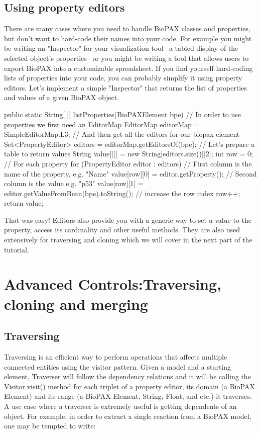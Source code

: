 \documentclass{tufte-book}
\begin{document}
\section{Using property editors}
There are many cases where you need to handle BioPAX classes and properties, but don't want to hard-code their names into your code. For example you might be writing an "Inspector" for your visualization tool --a tabled display of the selected object's properties-- or you might be writing a tool that allows users to export BioPAX into a customizable spreadsheet. If you find yourself hard-coding lists of properties into your code, you can probably simplify it using property editors.
Let's implement a simple "Inspector" that returns the list of properties and values of a given BioPAX object.

\begin{javacode}
public static String[][] listProperties(BioPAXElement bpe)
 {
  // In order to use properties we first need an EditorMap
  EditorMap editorMap = SimpleEditorMap.L3;
  // And then get all the editors for our biopax element
  Set<PropertyEditor> editors = editorMap.getEditorsOf(bpe);
  // Let's prepare a table to return values
  String value[][] = new String[editors.size()][2];
  int row = 0;
  // For each property
  for (PropertyEditor editor : editors)
  {
   // First column is the name of the property, e.g. "Name"
   value[row][0] = editor.getProperty();
   // Second column is the value e.g. "p53"
   value[row][1] = editor.getValueFromBean(bpe).toString();
   // increase the row index
   row++;
  }
  return value;
 }
\end{javacode}

That was easy! 
Editors also provide you with a generic way to set a value to the property, access its cardinality and other useful methods.  They are also used extensively for traversing and cloning which we will cover in the next part of the tutorial.


\chapter{Advanced Controls:Traversing, cloning and merging}
\section{Traversing}
Traversing is an efficient way to perform operations that affects multiple connected entities using the visitor pattern. Given a model and a starting element, Traverser will follow the dependency relations and it will be calling the Visitor.visit() method for each triplet of a property editor, its domain (a BioPAX Element) and its range (a BioPAX Element, String, Float, and etc.) it traverses. 
A use case where a traverser is extremely useful is getting dependents of an object. For example, in order to extract a single reaction from a BioPAX model, one may be tempted to write:
\end{document}
